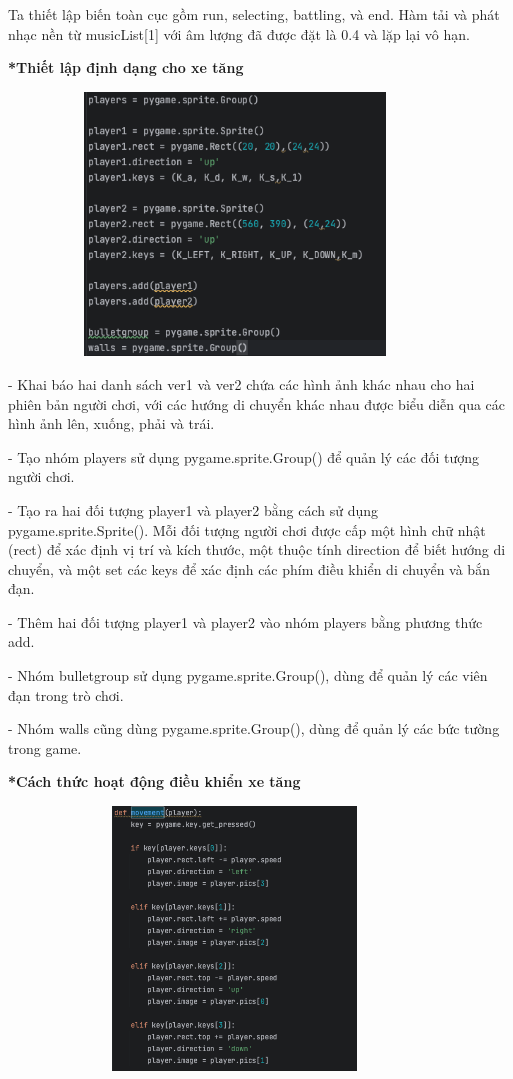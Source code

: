 \documentclass[a4paper]{article}
\begin{document}
        Ta thiết lập biến toàn cục gồm run, selecting, battling, và end. Hàm tải và phát nhạc nền từ musicList[1] với âm lượng đã được đặt là 0.4 và lặp lại vô hạn.

        \textbf{*Thiết lập định dạng cho xe tăng}

        \includegraphics[width=12cm,height=7cm]{positiontank.png}

        - Khai báo hai danh sách ver1 và ver2 chứa các hình ảnh khác nhau cho hai phiên bản người chơi, với các hướng di chuyển khác nhau được biểu diễn qua các hình ảnh lên, xuống, phải và trái.

        - Tạo nhóm players sử dụng pygame.sprite.Group() để quản lý các đối tượng người chơi.
        
        - Tạo ra hai đối tượng player1 và player2 bằng cách sử dụng pygame.sprite.Sprite(). Mỗi đối tượng người chơi được cấp một hình chữ nhật (rect) để xác định vị trí và kích thước, một thuộc tính direction để biết hướng di chuyển, và một set các keys để xác định các phím điều khiển di chuyển và bắn đạn.
        
        - Thêm hai đối tượng player1 và player2 vào nhóm players bằng phương thức add.

        - Nhóm bulletgroup sử dụng pygame.sprite.Group(), dùng để quản lý các viên đạn trong trò chơi.
        
        - Nhóm walls cũng dùng pygame.sprite.Group(), dùng để quản lý các bức tường trong game.

        \textbf{*Cách thức hoạt động điều khiển xe tăng}

         \includegraphics[width=12cm,height=7cm]{movetank1.png}
\end{document}
